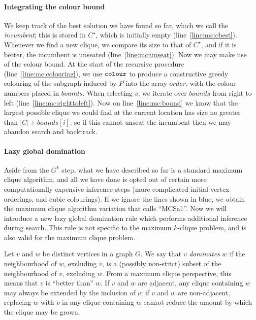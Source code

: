 \documentclass[letterpaper]{article}
\newcommand{\mcline}[1]{line~\ref{line:mc:#1}}
\newcommand{\Cbest}{C^\star}
\newcommand{\bounds}{\mathit{bounds}}
\newcommand{\order}{\mathit{order}}
\newcommand{\colourOrder}{\FuncSty{colour}}
\begin{document}
\paragraph{Integrating the colour bound}

We keep track of the best solution we have found so far, which we call the \emph{incumbent}; this is
stored in $\Cbest$, which is initially empty (\mcline{cbest}). Whenever we find a new clique, we
compare its size to that of $\Cbest$, and if it is better, the incumbent is unseated
(\mcline{unseat}). Now we may make use of the colour bound. At the start of the recursive procedure
(\mcline{colouring}), we use $\colourOrder$ to produce a constructive greedy colouring of the
subgraph induced by $P$ into the array $\order$, with the colour numbers placed in $\bounds$. When
selecting $v$, we iterate over $\bounds$ from right to left (\mcline{righttoleft}). Now on
\mcline{bound} we know that the largest possible clique we could find at the current location has
size no greater than $|C| + \bounds[i]$, so if this cannot unseat the incumbent then we may abandon
search and backtrack.

\paragraph{Lazy global domination}

Aside from the $G^k$ step, what we have described so far is a standard maximum clique algorithm, and
all we have done is opted out of certain more computationally expensive inference steps (more
complicated initial vertex orderings, and cubic colourings). If we ignore the lines shown in blue,
we obtain the maximum clique algorithm variation that \citeauthor{Prosser:2012}
 calls ``MCSa1''.  Now we will introduce a new lazy global domination rule
which performs additional inference during search. This rule is not specific to the maximum
$k$-clique problem, and is also valid for the maximum clique problem.

Let $v$ and $w$ be distinct vertices in a graph $G$. We say that $v$ \emph{dominates} $w$ if the
neighbourhood of $w$, excluding $v$, is a (possibly non-strict) subset of the neighbourhood of $v$,
excluding $w$. From a maximum clique perspective, this means that $v$ is ``better than'' $w$. If $v$
and $w$ are adjacent, any clique containing $w$ may always be extended by the inclusion of $v$; if
$v$ and $w$ are non-adjacent, replacing $w$ with $v$ in any clique containing $w$ cannot reduce the
amount by which the clique may be grown.
\end{document}
